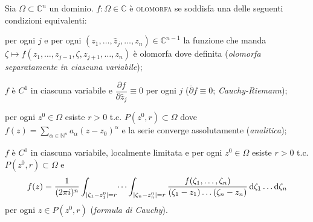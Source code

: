 \begin{defn}
  Sia $\Omega \subset \mathbb{C}^n$ un dominio. $f: \Omega \in \mathbb{C}$ è \textsc{olomorfa} se soddisfa una delle seguenti condizioni equivalenti:
  \begin{nlist}
    \item per ogni $j$ e per ogni $(z_1, \dots, \hat{z}_j,\dots, z_n) \in \mathbb{C}^{n-1}$ la funzione che manda $\zeta \longmapsto f(z_1, \dots, z_{j-1}, \zeta, z_{j+1}, \dots, z_n)$ è olomorfa dove definita (\textit{olomorfa separatamente in ciascuna variabile});
    \item $f$ è $C^1$ in ciascuna variabile e $\dfrac{\partial f}{\partial \bar{z}_j} \equiv 0$ per ogni $j$ ($\bar{\partial} f\equiv 0$; \textit{Cauchy-Riemann});
    \item per ogni $z^0 \in \Omega$ esiste $r>0$ t.c. $P(z^0, r) \subset \Omega$ dove $\displaystyle f(z)=\sum_{\alpha \in \mathbb{N}^n} a_{\alpha}(z-z_0)^{\alpha}$ e la serie converge assolutamente (\textit{analitica});
    \item $f$ è $C^0$ in ciascuna variabile, localmente limitata e per ogni $z^0 \in \Omega$ esiste $r>0$ t.c. $P(z^0, r) \subset \Omega$ e
    $$f(z)=\dfrac{1}{(2\pi i)^n} \int_{|\zeta_1-z_1^0|=r}\dots\int_{|\zeta_n-z_n^0|=r} \frac{f(\zeta_1,\dots,\zeta_n)}{(\zeta_1-z_1)\dots(\zeta_n-z_n)}\mathop{}\!\mathrm{d}\zeta_1\dots\mathop{}\!\mathrm{d}\zeta_n$$ per ogni $z \in P(z^0, r)$ (\textit{formula di Cauchy}).
  \end{nlist}
\end{defn}
